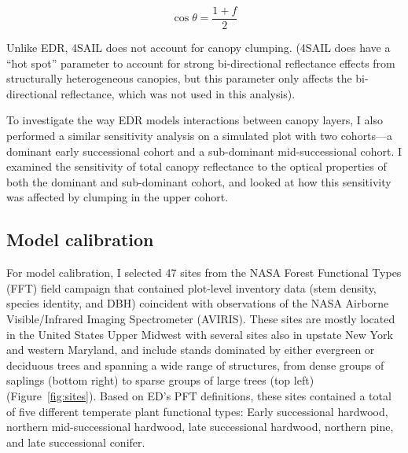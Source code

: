 \begin{equation}\label{eq:orient_lidf}
  \cos \theta = \frac{1 + f}{2}
\end{equation}

Unlike EDR, 4SAIL does not account for canopy clumping.
(4SAIL does have a ``hot spot'' parameter to account for strong bi-directional reflectance effects from structurally heterogeneous canopies, but this parameter only affects the bi-directional reflectance, which was not used in this analysis).

To investigate the way EDR models interactions between canopy layers, I also performed a similar sensitivity analysis on a simulated plot with two cohorts---a dominant early successional cohort and a sub-dominant mid-successional cohort.
I examined the sensitivity of total canopy reflectance to the optical properties of both the dominant and sub-dominant cohort, and looked at how this sensitivity was affected by clumping in the upper cohort.

\subsection{Model calibration}

For model calibration, I selected 47 sites from the NASA Forest Functional Types (FFT) field campaign that contained plot-level inventory data (stem density, species identity, and DBH) coincident with observations of the NASA Airborne Visible/Infrared Imaging Spectrometer (AVIRIS).
These sites are mostly located in the United States Upper Midwest with several sites also in upstate New York and western Maryland, and include stands dominated by either evergreen or deciduous trees and spanning a wide range of structures, from dense groups of saplings (bottom right) to sparse groups of large trees (top left) (Figure~\ref{fig:sites}).
Based on ED's PFT definitions, these sites contained a total of five different temperate plant functional types: Early successional hardwood, northern mid-successional hardwood, late successional hardwood, northern pine, and late successional conifer.

